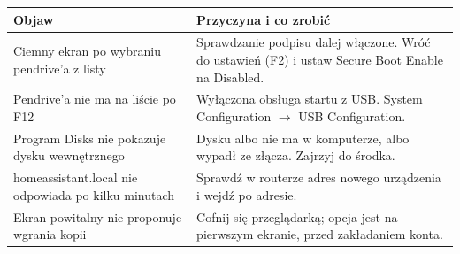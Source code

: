 \documentclass[11pt,a4paper]{article}
\newcommand{\kod}[1]{{\monofont #1}}
\begin{document}
\begin{center}
\begin{tabular}{p{}p{}}
\toprule
\textbf{Objaw} & \textbf{Przyczyna i co zrobi\'c} \\
\midrule
Ciemny ekran po wybraniu pendrive'a z listy & Sprawdzanie podpisu dalej w\l{}\k{a}czone. Wr\'o\'c do
ustawie\'n (F2) i ustaw \kod{Secure Boot Enable} na \kod{Disabled}. \\
\addlinespace
Pendrive'a nie ma na li\'scie po F12 & Wy\l{}\k{a}czona obs\l{}uga startu z USB.
\kod{System Configuration} $\rightarrow$ \kod{USB Configuration}. \\
\addlinespace
Program \kod{Disks} nie pokazuje dysku wewn\k{e}trznego & Dysku albo nie ma w komputerze,
albo wypad\l{} ze z\l{}\k{a}cza. Zajrzyj do \'srodka. \\
\addlinespace
\kod{homeassistant.local} nie odpowiada po kilku minutach & Sprawd\'z w routerze adres nowego
urz\k{a}dzenia i wejd\'z po adresie. \\
\addlinespace
Ekran powitalny nie proponuje wgrania kopii & Cofnij si\k{e} przegl\k{a}dark\k{a}; opcja jest na
pierwszym ekranie, przed zak\l{}adaniem konta. \\
\bottomrule
\end{tabular}
\end{center}

\vspace{1em}
\end{document}
